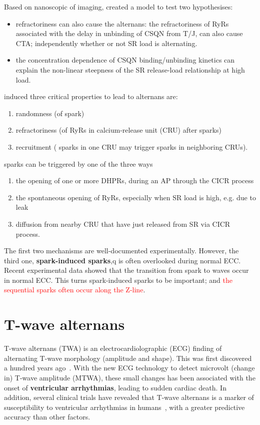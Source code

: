 Based on nanoscopic of imaging, \citep{restrepo2008cmm} created a
model to test two hypothesises:
\begin{itemize}
\item refractoriness can also cause the alternans: the refractoriness
  of RyRs associated with the delay in unbinding of CSQN from T/J, can
  also cause CTA; independently whether or not SR load is
  alternating. 
\item the  concentration dependence of CSQN
  binding/unbinding kinetics can explain the non-linear steepness of
  the SR release-load relationship at high load.
\end{itemize}

\citep{rovetti2010sis} induced three critical properties to lead to
 alternans are:
\begin{enumerate}
\item randomness (of  spark)
\item refractoriness (of
 RyRs in calcium-release unit (CRU) after
   sparks)
\item recruitment ( sparks in one CRU may trigger 
  sparks in neighboring CRUs).
\end{enumerate}

 sparks can be triggered by one of the three ways
\begin{enumerate}
\item the opening of one or more DHPRs, during an AP through the CICR process
\item the spontaneous opening of RyRs, especially when SR 
  load is high, e.g. due to  leak
\item {} diffusion from nearby CRU that have just released
   from SR via CICR process. 
\end{enumerate}
The first two mechanisms are well-documented experimentally. However,
the third one, {\bf spark-induced sparks},q is often overlooked during
normal ECC. Recent experimental data showed that the transition from
 spark to  waves occur in normal ECC. This turns
spark-induced sparks to be important; and
\textcolor{red}{the sequential sparks often occur along the Z-line}.

\section{T-wave alternans}
\label{sec:t-wave-alternans}

T-wave alternans (TWA) is an electrocardiolographic (ECG) finding of
alternating T-wave morphology (amplitude and shape). This was first
discovered a hundred years ago~\citep{herring1909}.  With the new ECG
technology to detect microvolt (change in) T-wave amplitude (MTWA),
these small changes has been associated with the onset of
{\bf ventricular arrhythmias}, leading to sudden cardiac death. In
addition, several clinical trials have revealed that T-wave alternans
is a marker of susceptibility to ventricular arrhythmias in
humans~\citep{kavesh1998,ikeda2000,klingenheben2000}, with a greater
predictive accuracy than other factors.

